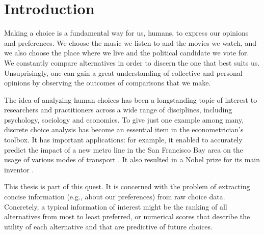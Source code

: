 \chapter{Introduction}

Making a choice is a fundamental way for us, humans, to express our opinions and preferences.
We choose the music we listen to and the movies we watch, and we also choose the place where we live and the political candidate we vote for.
We constantly compare alternatives in order to discern the one that best suits us.
Unsuprisingly, one can gain a great understanding of collective and personal opinions by observing the outcomes of comparisons that we make.

The idea of analyzing human choices has been a longstanding topic of interest to researchers and practitioners across a wide range of disciplines, including psychology, sociology and economics.
To give just one example among many, discrete choice analysis has become an essential item in the econometrician's toolbox.
It has important applications: for example, it enabled to accurately predict the impact of a new metro line in the San Francisco Bay area on the usage of various modes of transport \citep{mcfaddenxxx}.
It also resulted in a Nobel prize for its main inventor \citep{mcfadden2000economic}.

This thesis is part of this quest.
It is concerned with the problem of extracting concise information (e.g., about our preferences) from raw choice data.
Concretely, a typical information of interest might be the ranking of all alternatives from most to least preferred, or numerical scores that describe the utility of each alternative and that are predictive of future choices.

